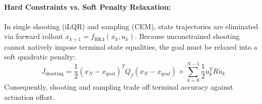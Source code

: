 \documentclass[11pt,a4paper]{article}
\begin{document}
\paragraph{Hard Constraints vs. Soft Penalty Relaxation:}
In single shooting (iLQR) and sampling (CEM), state trajectories are eliminated via forward rollout $x_{k+1} = f_{\text{RK4}}(x_k, u_k)$. Because unconstrained shooting cannot natively impose terminal state equalities, the goal must be relaxed into a soft quadratic penalty:
\begin{equation}
J_{\text{shooting}} = \frac{1}{2} (x_N - x_{\text{goal}})^T Q_f (x_N - x_{\text{goal}}) + \sum_{k=0}^{N-1} \frac{1}{2} u_k^T R u_k
\end{equation}
Consequently, shooting and sampling trade off terminal accuracy against actuation effort.

\begin{table}[H]
\centering
\small
{}
\caption{Benchmark results for Experiment 32: Direct Collocation vs. iLQR vs. CEM offline cart-pole swing-up (from \texttt{experiments/32\_direct\_collocation\_vs\_ilqr/table.md}).}
\label{tab:exp32}
\end{table}
\end{document}
